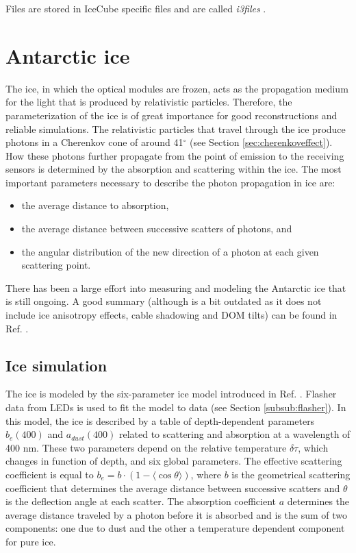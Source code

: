 \noindent Files are stored in IceCube specific files and are called \textit{i3files} .

\section{Antarctic ice}
\label{sec:ice}
The ice, in which the optical modules are frozen, acts as the propagation medium for the light that is produced by relativistic particles. Therefore, the parameterization of the ice is of great importance for good reconstructions and reliable simulations. The relativistic particles that travel through the ice produce photons in a Cherenkov cone of around 41$^\circ$ (see Section \ref{sec:cherenkoveffect}). How these photons further propagate from the point of emission to the receiving sensors is determined by the absorption and scattering within the ice. The most important parameters necessary to describe the photon propagation in ice are:
\vspace{2mm}
\begin{itemize}
\item the average distance to absorption,
\item the average distance between successive scatters of photons, and 
\item the angular distribution of the new direction of a photon at each given scattering point.
\end{itemize}
\vspace{2mm}
There has been a large effort into measuring and modeling the Antarctic ice that is still ongoing. A good summary (although is a bit outdated as it does not include ice anisotropy effects, cable shadowing and DOM tilts) can be found in Ref. \cite{Aartsen:2013rt}.

\subsection{Ice simulation}
\label{subsec:icesimulation}
The ice is modeled by the six-parameter ice model introduced in Ref. \cite{Ackermann:2006pva}. Flasher data from LEDs is used to fit the model to data (see Section  \ref{subsub:flasher}). In this model, the ice is described by a table of depth-dependent parameters $b_e(400)$ and $a_{dust}(400)$ related to scattering and absorption at a wavelength of 400 nm. These two parameters depend on the relative temperature $\delta \tau$, which changes in function of depth, and six global parameters. The effective scattering coefficient is equal to $b_e = b \cdot \left( 1-\langle \cos \theta \rangle \right)$, where $b$ is the geometrical scattering coefficient that determines the average distance between successive scatters and $\theta$ is the deflection angle at each scatter. The absorption coefficient $a$ determines the average distance traveled by a photon before it is absorbed and is the sum of two components: one due to dust and the other a temperature dependent component for pure ice.


